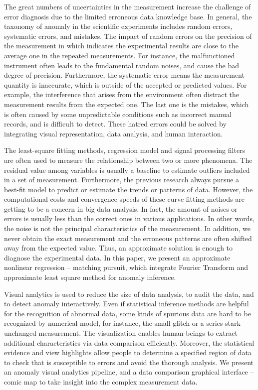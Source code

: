 \documentclass{vgtc}                          %
\begin{document}
The great numbers of uncertainties in the measurement increase the challenge of error diagnosis due to the limited erroneous data knowledge base. In general, the taxonomy of anomaly in the scientific experiments includes random errors, systematic errors, and mistakes. The impact of random errors on the precision of the measurement in which indicates the experimental results are close to the average one in the repeated measurements. For instance, the malfunctioned instrument often leads to the fundamental random noises, and cause the bad degree of precision. Furthermore, the systematic error means the measurement quantity is inaccurate, which is outside of the accepted or predicted values. For example, the interference that arises from the environment often distract the measurement results from the expected one. The last one is the mistakes, which is often caused by some unpredictable conditions such as incorrect manual records, and is difficult to detect. These hatred errors could be solved by integrating visual representation, data analysis, and human interaction.

The least-square fitting methods, regression model and signal processing filters are often used to measure the relationship between two or more phenomena. The residual value among variables is usually a baseline to estimate outliers included in a set of measurement. Furthermore, the previous research always pursue a best-fit model to predict or estimate the trends or patterns of data. However, the computational costs and convergence speeds of these curve fitting methods are getting to be a concern in big data analysis. In fact, the amount of noises or errors is usually less than the correct ones in various applications. In other words, the noise is not the principal characteristics of the measurement. In addition, we never obtain the exact measurement and the erroneous patterns are often shifted away from the expected value. Thus, an approximate solution is enough to diagnose the experimental data. In this paper, we present an approximate nonlinear regression -- matching pursuit, which integrate Fourier Transform and approximate least square method for anomaly inference.

Visual analytics is used to reduce the size of data analysis, to audit the data, and to detect anomaly interactively. Even if statistical inference methods are helpful for the recognition of abnormal data, some kinds of spurious data are hard to be recognized by numerical model, for instance, the small glitch or a series stark unchanged measurement. The visualization enables human-beings to extract additional characteristics via data comparison efficiently. Moreover, the statistical evidence and view highlights allow people to determine a specified region of data to check that is susceptible to errors and avoid the thorough analysis. We present an anomaly visual analytics pipeline, and a data comparison graphical interface -- comic map to take insight into the complex measurement data.
	
\end{document}
